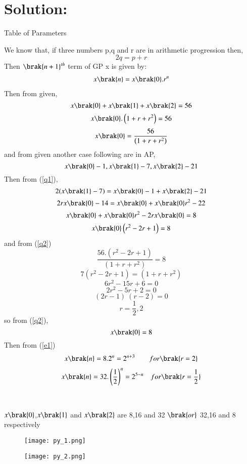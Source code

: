 \documentclass[beamer]{IEEEtran}
\theoremstyle{remark}
\begin{document}
\section*{Solution:}
{\centering
Table of Parameters\\
}
\begin{table}[h]
    \centering
    
     \label{tab:t1}
\end{table}
We know that, if three numbers p,q and r are in arithmetic progression then,
\begin{equation}
\label{q1}
2q = p + r
\end{equation}
Then $\brak{n+1}^{th}$ term of GP x is given by:\\
\begin{align}
\label{e1}
x\brak{n}=x\brak{0}.r^{n}
\end{align}
Then from given,
\[x\brak{0}+x\brak{1}+x\brak{2}=56\]
\[x\brak{0}.\left(1+r+r^2\right)=56\]
\begin{equation}
\label{q2}
x\brak{0}=\frac{56}{\left(1+r+r^2\right)}
\end{equation}
and from given another case following are in AP,
\[x\brak{0}-1,x\brak{1}-7,x\brak{2}-21\]
Then from (\ref{q1}),
\[2(x\brak{1}-7)=x\brak{0}-1+x\brak{2}-21\]
\[2rx\brak{0}-14=x\brak{0}+x\brak{0}r^2-22\]
\[x\brak{0}+x\brak{0}r^2-2rx\brak{0}=8\]
\[x\brak{0}\left(r^2-2r+1\right)=8\]
and from (\ref{q2})
\[\frac{56.\left(r^2-2r+1\right)}{\left(1+r+r^2\right)}=8\]
\[7\left(r^2-2r+1\right)=\left(1+r+r^2\right)\]
\[6r^2-15r+6=0\]
\[2r^2-5r+2=0\]
\[(2r-1)\ (r-2)=0\]
\begin{equation}
\label{q3}
r=\frac{1}{2},2
\end{equation}
so from (\ref{q2}),
\[x\brak{0}=8\]
Then from (\ref{e1})
\begin{align}
    \label{a11}
    x\brak{n}=8.2^{n}=2^{n+3}\qquad for \brak{r=2}
\end{align}
\begin{align}
    \label{a12}
    x\brak{n}=32.\left(\frac{1}{2}\right)^{n}=2^{5-n}\quad for \brak{r=\frac{1}{2}}
\end{align}\\\\
$x\brak{0}$,$x\brak{1}$ and $x\brak{2}$ are 8,16 and 32 $\brak{or}$ 32,16 and 8 respectively
\begin{figure}[h]
    \centering
    \texttt{[image: py\_1.png]}
    \label{fig:enter-label}
\end{figure}
\begin{figure}[h]
    \centering
    \texttt{[image: py\_2.png]}
    \label{fig:enter-label}
\end{figure}
\end{document}
